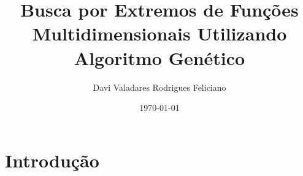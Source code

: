 

\title[Algoritmo Genético para Otimização Numérica]
{Busca por Extremos de Funções Multidimensionais Utilizando Algoritmo Genético}
\author{Davi Valadares Rodrigues Feliciano}
\date{\today}



\section{Introdução}

\begin{frame}
  \maketitle
\end{frame}

